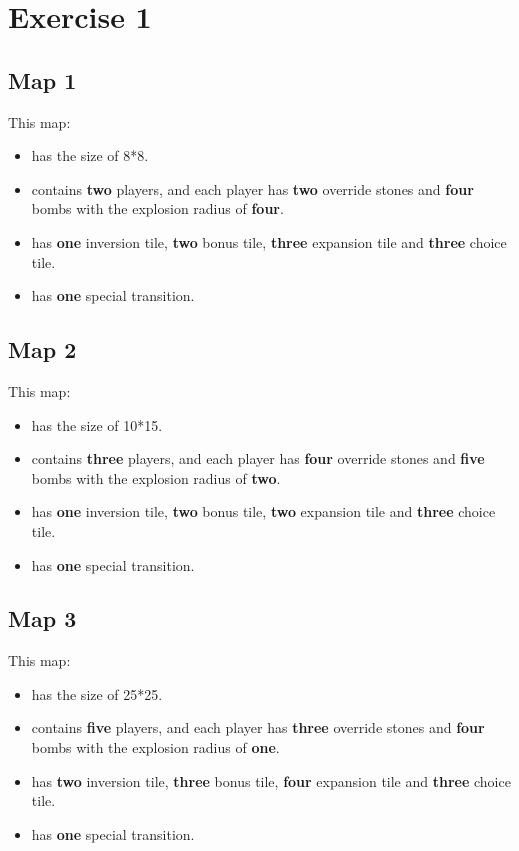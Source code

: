 \section{Exercise 1}
\subsection{Map 1}
  This map:
  \begin{itemize}
      \item has the size of 8*8.
      \item contains \textbf{two} players, and each player has \textbf{two} override stones and \textbf{four} bombs with the explosion radius of \textbf{four}.
      \item has \textbf{one} inversion tile, \textbf{two} bonus tile, \textbf{three} expansion tile and \textbf{three} choice tile.
      \item  has \textbf{one} special transition.
  \end{itemize}
  
\subsection{Map 2}
  This map:
  \begin{itemize}
      \item has the size of 10*15.
      \item contains \textbf{three} players, and each player has \textbf{four} override stones and \textbf{five} bombs with the explosion radius of \textbf{two}.
      \item has \textbf{one} inversion tile, \textbf{two} bonus tile, \textbf{two} expansion tile and \textbf{three} choice tile.
      \item  has \textbf{one} special transition.
  \end{itemize}

\subsection{Map 3}
  This map:
  \begin{itemize}
      \item has the size of 25*25.
      \item contains \textbf{five} players, and each player has \textbf{three} override stones and \textbf{four} bombs with the explosion radius of \textbf{one}.
      \item has \textbf{two} inversion tile, \textbf{three} bonus tile, \textbf{four} expansion tile and \textbf{three} choice tile.
      \item  has \textbf{one} special transition.
  \end{itemize}